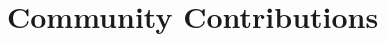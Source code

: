 \documentclass[]{resume-openfont-compact}
\newcommand{\projectHeading}[3]{\Project{#1}{#2}
\descript{#3}\\}
\begin{document}

\sectionsep


\section{Community Contributions}
\end{document}
